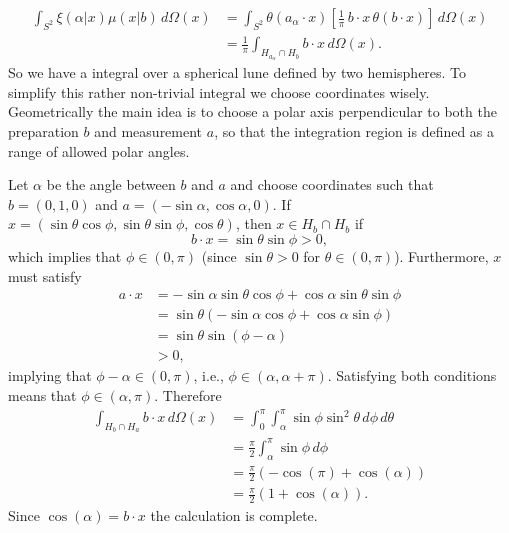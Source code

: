 \documentclass[12pt,draft]{article}
\theoremstyle{definition}
\theoremstyle{plain}
\begin{document}
{\begin{align}
            \int_{S^2} \xi(\alpha | x) \mu(x | b) \,
            d\Omega(x)
            &= \int_{S^2} \theta(a_\alpha \cdot x) \left[
                \frac{1}{\pi} \, b \cdot x \, \theta(b \cdot
                x) 
            \right] \, d\Omega(x) \\
            &= \frac{1}{\pi} \int_{H_{a_\alpha} \cap H_b}
            b \cdot x \, d\Omega(x).
        \end{align}
        So we have a integral over a spherical lune defined
        by two hemispheres. To simplify this rather
        non-trivial integral we choose coordinates wisely.
        Geometrically the main idea is to choose a polar
        axis perpendicular to both the preparation $b$ and
        measurement $a$, so that the integration region is
        defined as a range of allowed polar angles.

        Let $\alpha$ be the angle between $b$ and $a$ and
        choose coordinates such that $b = (0,1,0)$ and $a =
        (-\sin\alpha, \cos\alpha,0)$. If $x =
        (\sin\theta\cos\phi,\sin\theta\sin\phi,\cos\theta)$,
        then $x \in H_b \cap H_b$ if
        \begin{equation}
            b \cdot x
            = \sin\theta\sin\phi > 0,
        \end{equation}
        which implies that $\phi \in (0,\pi)$ (since
        $\sin\theta > 0$ for $\theta \in (0,\pi)$).
        Furthermore, $x$ must satisfy
        \begin{align}
            a \cdot x
            &= -\sin\alpha \sin\theta\cos\phi + \cos\alpha
            \sin\theta\sin\phi \\
            &= \sin\theta \left( 
                -\sin\alpha\cos\phi + \cos\alpha\sin\phi
            \right) \\
            &= \sin\theta \sin(\phi - \alpha) \\
            &> 0,
        \end{align}
        implying that $\phi - \alpha \in (0,\pi)$, i.e.,
        $\phi \in (\alpha,\alpha + \pi)$. Satisfying both
        conditions means that $\phi \in (\alpha, \pi)$.
        Therefore
        \begin{align}
            \int_{H_b \cap H_a} b \cdot x \, d\Omega(x)
            &= \int_{0}^{\pi} \int_{\alpha}^{\pi} \sin\phi
            \sin^2\theta \, d\phi \, d\theta \\
            &= \frac{\pi}{2}
            \int_{\alpha}^{\pi} \sin\phi \, d\phi
            \\
            &= \frac{\pi}{2} \left(
                -\cos(\pi) + \cos(\alpha)
            \right) \\
            &= \frac{\pi}{2} \left( 
                1 + \cos(\alpha)
            \right). 
        \end{align}
        Since $\cos(\alpha) = b \cdot x$ the calculation is
        complete.
        
}
\end{document}
